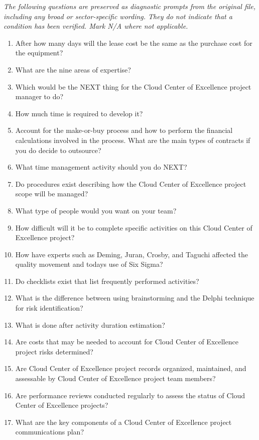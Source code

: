 \documentclass[10pt,letterpaper]{article}
\newcommand{\docsection}[1]{\par\Needspace{5\baselineskip}\vspace{8pt}{\large\sffamily\bfseries\color{navy}#1}\par\vspace{2pt}{\color{rulegrey}\rule{\linewidth}{.6pt}}\par}
\begin{document}
\docsection{03 \quad Source diagnostic checklist}
\textit{The following questions are preserved as diagnostic prompts from the original file, including any broad or sector-specific wording. They do not indicate that a condition has been verified. Mark N/A where not applicable.}
\begingroup\small\begin{enumerate}[leftmargin=2.1em, itemsep=4pt]
\item[1.] After how many days will the lease cost be the same as the purchase cost for the equipment?
\item[2.] What are the nine areas of expertise?
\item[3.] Which would be the NEXT thing for the Cloud Center of Excellence project manager to do?
\item[4.] How much time is required to develop it?
\item[5.] Account for the make-or-buy process and how to perform the financial calculations involved in the process. What are the main types of contracts if you do decide to outsource?
\item[6.] What time management activity should you do NEXT?
\item[7.] Do procedures exist describing how the Cloud Center of Excellence project scope will be managed?
\item[8.] What type of people would you want on your team?
\item[9.] How difficult will it be to complete specific activities on this Cloud Center of Excellence project?
\item[10.] How have experts such as Deming, Juran, Crosby, and Taguchi affected the quality movement and todays use of Six Sigma?
\item[11.] Do checklists exist that list frequently performed activities?
\item[12.] What is the difference between using brainstorming and the Delphi technique for risk identification?
\item[13.] What is done after activity duration estimation?
\item[14.] Are costs that may be needed to account for Cloud Center of Excellence project risks determined?
\item[15.] Are Cloud Center of Excellence project records organized, maintained, and assessable by Cloud Center of Excellence project team members?
\item[16.] Are performance reviews conducted regularly to assess the status of Cloud Center of Excellence projects?
\item[17.] What are the key components of a Cloud Center of Excellence project communications plan?

\end{enumerate}
\end{document}
